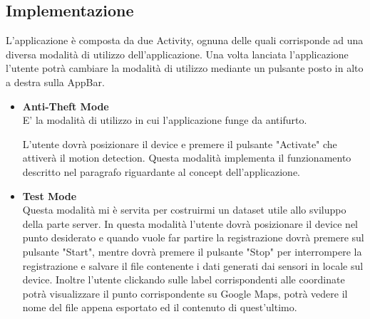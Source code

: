 \documentclass[12pt,a4paper,openright,twoside]{report}
\begin{document}
\subsection{Implementazione}
L'applicazione è composta da due Activity, ognuna delle quali corrisponde ad una diversa modalità di utilizzo dell'applicazione. Una volta lanciata l'applicazione l'utente potrà cambiare la modalità di utilizzo mediante un pulsante posto in alto a destra sulla AppBar.
\begin{itemize}
\item \textbf{Anti-Theft Mode}\\
E' la modalità di utilizzo in cui l'applicazione funge da antifurto. 

L'utente dovrà posizionare il device e premere il pulsante "Activate" che attiverà il motion detection. Questa modalità implementa il funzionamento descritto nel paragrafo riguardante al concept dell'applicazione.

\item \textbf{Test Mode}\\
Questa modalità mi è servita per costruirmi un dataset utile allo sviluppo della parte server. In questa modalità l'utente dovrà posizionare il device
nel punto desiderato e quando vuole far partire la registrazione dovrà premere sul pulsante "Start", mentre dovrà premere il pulsante "Stop" per interrompere la registrazione e salvare il file contenente i dati generati dai sensori in locale sul device. Inoltre l'utente clickando sulle label corrispondenti alle coordinate potrà visualizzare il punto corrispondente su Google Maps, potrà vedere il nome del file appena esportato ed il contenuto di quest'ultimo.
\end{itemize}
\end{document}
